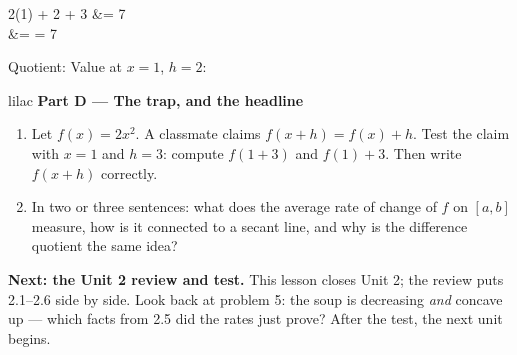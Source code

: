 \documentclass[10pt]{article}
\begin{document}
\begin{enumerate}[leftmargin=1.9em, itemsep=9pt, start=6]
\begin{minipage}[t]{0.44\linewidth}
\begin{work}
  2(1) + 2 + 3 &= 7 \\
   &=  = 7
\end{work}
      \end{minipage}

      Quotient: \blank{2.6cm} \qquad Value at $x = 1$, $h = 2$: \blank{1.4cm}

\end{enumerate}

\vspace{0.06in}

\begin{headlinebox}{lilac}
\textbf{\color{plum}Part D --- The trap, and the headline}
\end{headlinebox}

\begin{enumerate}[leftmargin=1.9em, itemsep=9pt, start=9]

\item Let $f(x) = 2x^2$. A classmate claims $f(x + h) = f(x) + h$. Test the claim with $x = 1$
      and $h = 3$: compute $f(1 + 3)$ and $f(1) + 3$. Then write $f(x + h)$ correctly.
      \writespace{1.5cm}{}

\item In two or three sentences: what does the average rate of change of $f$ on $[a, b]$
      measure, how is it connected to a secant line, and why is the difference quotient the
      same idea?
      \writespace{1.9cm}{}

\end{enumerate}

\vspace{0.06in}

\boxguard[8]
\begin{spiralbox}
\small
\textbf{Next: the Unit 2 review and test.} This lesson closes Unit 2; the review puts
2.1--2.6 side by side. Look back at problem 5: the soup is decreasing \emph{and} concave up ---
which facts from 2.5 did the rates just prove? After the test, the next unit begins.
\end{spiralbox}
\end{document}
